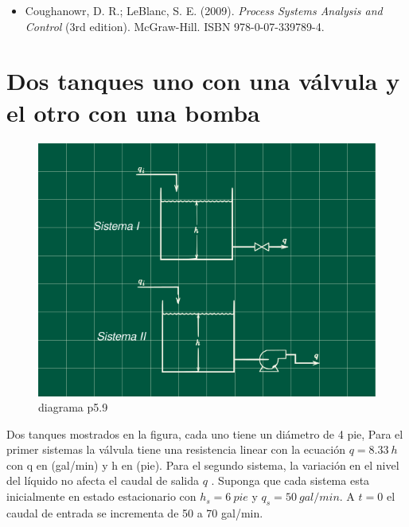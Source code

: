 \documentclass[
  letterpaper,
  DIV=11,
  numbers=noendperiod]{scrreprt}
\providecommand{\tightlist}{%
  \setlength{\itemsep}{0pt}\setlength{\parskip}{0pt}}\usepackage{longtable,booktabs,array}
\begin{document}
\begin{itemize}
\tightlist
\item
  Coughanowr, D. R.; LeBlanc, S. E. (2009). \emph{Process Systems
  Analysis and Control} (3rd edition). McGraw-Hill. ISBN
  978-0-07-339789-4.
\end{itemize}

\hypertarget{dos-tanques-uno-con-una-vuxe1lvula-y-el-otro-con-una-bomba}{%
\chapter{Dos tanques uno con una válvula y el otro con una
bomba}\label{dos-tanques-uno-con-una-vuxe1lvula-y-el-otro-con-una-bomba}}

\begin{figure}

{\centering \includegraphics{././images/p5.9-seborg/headercontrol59s.png}

}

\caption{diagrama p5.9}

\end{figure}

Dos tanques mostrados en la figura, cada uno tiene un diámetro de 4 pie,
Para el primer sistemas la válvula tiene una resistencia linear con la
ecuación \(q = 8.33\  h\) con q en (gal/min) y h en (pie). Para el
segundo sistema, la variación en el nivel del líquido no afecta el
caudal de salida \(q\) . Suponga que cada sistema esta inicialmente en
estado estacionario con \(h_s = 6\ pie\) y \(q_s = 50\ gal/min\). A
\(t=0\) el caudal de entrada se incrementa de 50 a 70 gal/min.
\end{document}
